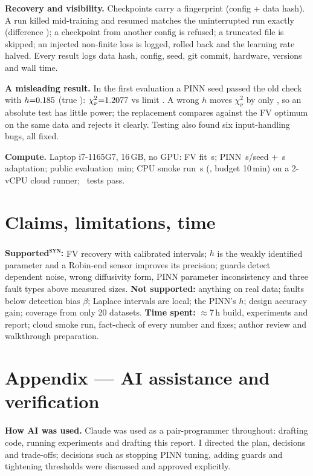\documentclass[10pt]{article}
\newcommand{\syn}{\textsuperscript{\textsc{syn}}}
\begin{document}
\textbf{Recovery and visibility.} Checkpoints carry a fingerprint (config + data hash). A run killed
mid-training and resumed matches the uninterrupted run exactly (difference \RestartDiff); a checkpoint
from another config is refused; a truncated file is skipped; an injected non-finite loss is logged,
rolled back and the learning rate halved. Every result logs data hash, config, seed, git commit, hardware,
versions and wall time.

\textbf{A misleading result.} In the first evaluation a PINN seed passed the old check with
$h{=}0.185$ (true \TrueH): $\chi^2_\nu{=}1.2077$ vs limit \VOneSeedTwoLim. A wrong $h$ moves
$\chi^2_\nu$ by only \VOneChiGap, so an absolute test has little power; the replacement compares against
the FV optimum on the same data and rejects it clearly. Testing also found six input-handling bugs, all fixed.

\textbf{Compute.} Laptop i7-1165G7, 16\,GB, no GPU: FV fit \FvFitSec\,s; PINN \PinnTrainSec\,s/seed +
\PinnAdaptSec\,s adaptation; public evaluation \EvalWall\,min; CPU smoke run \SmokeSec\,s (\SmokeOk, budget
10\,min) on a 2-vCPU cloud runner; \NTests\ tests pass.

\section{Claims, limitations, time}
\textbf{Supported\syn:} FV recovery with calibrated intervals; $h$ is the weakly identified parameter and a
Robin-end sensor improves its precision; guards detect dependent noise, wrong diffusivity form, PINN
parameter inconsistency and three fault types above measured sizes.
\textbf{Not supported:} anything on real data; faults below detection bias $\beta$; Laplace intervals are
local; the PINN's $h$; design accuracy gain; coverage from only 20 datasets.
\textbf{Time spent:} $\approx$7\,h build, experiments and report;
cloud smoke run, fact-check of every number and fixes; author review and walkthrough preparation.

\clearpage
\section*{Appendix --- AI assistance and verification}
\textbf{How AI was used.} Claude was used as a pair-programmer throughout: drafting code, running
experiments and drafting this report. I directed the plan, decisions and trade-offs; decisions such as
stopping PINN tuning, adding guards and tightening thresholds were discussed and approved explicitly.
\end{document}
